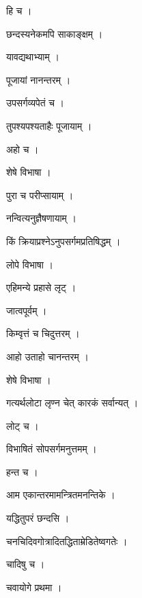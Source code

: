 \documentclass[10pt, openany, oneside]{book}
\begin{document}
\noindent हि च ।

\noindent छन्दस्यनेकमपि साकाङ्क्षम् ।

\noindent यावद्यथाभ्याम् ।

\noindent पूजायां नानन्तरम् ।

\noindent उपसर्गव्यपेतं च ।

\noindent तुपश्यपश्यताहैः पूजायाम् ।

\noindent अहो च ।

\noindent शेषे विभाषा ।

\noindent पुरा च परीप्सायाम् ।

\noindent नन्वित्यनुज्ञैषणायाम् ।

\noindent किं क्रियाप्रश्नेऽनुपसर्गमप्रतिषिद्धम् ।

\noindent लोपे विभाषा ।

\noindent एहिमन्ये प्रहासे लृट् ।

\noindent जात्वपूर्वम् ।

\noindent किम्वृत्तं च चिदुत्तरम् ।

\noindent आहो उताहो चानन्तरम् ।

\noindent शेषे विभाषा ।

\noindent गत्यर्थलोटा लृण्न चेत् कारकं सर्वान्यत् ।

\noindent लोट् च ।

\noindent विभाषितं सोपसर्गमनुत्तमम् ।

\noindent हन्त च ।

\noindent आम एकान्तरमामन्त्रितमनन्तिके ।

\noindent यद्धितुपरं छन्दसि ।

\noindent चनचिदिवगोत्रादितद्धिताम्रेडितेष्वगतेः ।

\noindent चादिषु च ।

\noindent चवायोगे प्रथमा ।
\end{document}
